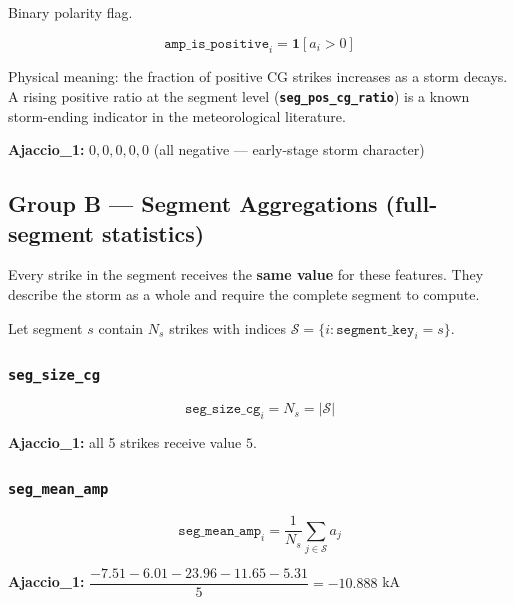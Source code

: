 \documentclass[12pt,a4paper]{article}
\newcommand{\feat}[1]{\texttt{\textbf{#1}}}
\begin{document}
Binary polarity flag.

\begin{formulabox}
\[
  \texttt{amp\_is\_positive}_i = \mathbf{1}[a_i > 0]
\]
\end{formulabox}

Physical meaning: the fraction of positive CG strikes increases as a storm decays. A rising positive ratio at the segment level (\feat{seg\_pos\_cg\_ratio}) is a known storm-ending indicator in the meteorological literature.

\textbf{Ajaccio\_1:} $0, 0, 0, 0, 0$ (all negative --- early-stage storm character)

\vspace{1em}

\subsection{Group B --- Segment Aggregations (full-segment statistics)}

Every strike in the segment receives the \textbf{same value} for these features. They describe the storm as a whole and require the complete segment to compute.

Let segment $s$ contain $N_s$ strikes with indices $\mathcal{S} = \{i : \texttt{segment\_key}_i = s\}$.

\subsubsection*{\feat{seg\_size\_cg}}

\begin{formulabox}
\[
  \texttt{seg\_size\_cg}_i = N_s = |\mathcal{S}|
\]
\end{formulabox}

\textbf{Ajaccio\_1:} all 5 strikes receive value $5$.

\subsubsection*{\feat{seg\_mean\_amp}}

\begin{formulabox}
\[
  \texttt{seg\_mean\_amp}_i = \frac{1}{N_s} \sum_{j \in \mathcal{S}} a_j
\]
\end{formulabox}

\textbf{Ajaccio\_1:} $\dfrac{-7.51 - 6.01 - 23.96 - 11.65 - 5.31}{5} = -10.888$ kA
\end{document}

